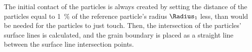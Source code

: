 The initial contact of the particles is always created by setting the distance of the particles equal to \qty{1}{\percent} of the reference particle's radius $\Radius_1$ less, than would be needed for the particles to just touch.
Then, the intersection of the particles' surface lines is calculated, and the grain boundary is placed as a straight line between the surface line intersection points.








\clearpage
